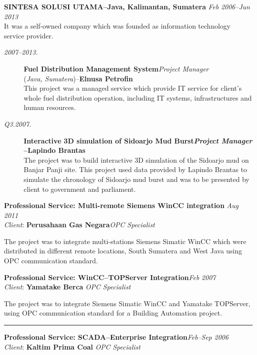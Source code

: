\documentclass[12pt]{res} %
\begin{document}
\begin{resume}
{\bf \uppercase{Sintesa Solusi Utama}--Java, Kalimantan, Sumatera} \hfill {\sl Feb 2006--Jun 2013} \\
It was a self-owned company which was founded as information technology service provider.

\vspace{10pt} 
\begin{description}
    \item[{\sl {\footnotesize 2007--2013}.}] {\bf Fuel Distribution Management System}\hfill {\sl Project Manager}\\({\sl Java, Sumatera})--{\bf Elnusa Petrofin}\\
    This project was a managed service which provide IT service for client's whole fuel distribution operation, including IT systems, infrastructures
    and human resources.
    \item[{\sl {\footnotesize Q3.2007}.}] {\bf Interactive 3D simulation of Sidoarjo Mud Burst\hfill {\sl Project Manager}\\--Lapindo Brantas}\\
    The project was to build interactive 3D simulation of the Sidoarjo mud on Banjar Panji site. This project used data provided by Lapindo Brantas 
    to simulate the chronology of Sidoarjo mud burst and was to be presented by client to government and parliament.
\end{description}

{\bf Professional Service: Multi-remote Siemens WinCC integration} \hfill {\sl Aug 2011}\\
{\sl Client}: {\bf Perusahaan Gas Negara}\hfill {\sl OPC Specialist}

\vspace{-10pt} 
The project was to integrate multi-stations Siemens Simatic WinCC which were distributed
in different remote locations, South Sumatera and West Java using OPC communication standard.

{\bf Professional Service: WinCC--TOPServer Integration}\hfill {\sl Feb 2007}\\
{\sl Client}: {\bf Yamatake Berca} \hfill {\sl OPC Specialist}

\vspace{-10pt} 
The project was to integrate Siemens Simatic WinCC and Yamatake TOPServer, using OPC
communication standard for a Building Automation project.
\begin{center}
	\rule{0.5\textwidth}{.2pt}
\end{center}

{\bf Professional Service: SCADA--Enterprise Integration}\hfill {\sl Feb--Sep 2006}\\
{\sl Client}: {\bf Kaltim Prima Coal} \hfill {\sl OPC Specialist}


\end{resume}
\end{document}
